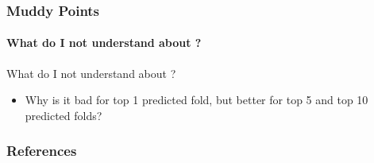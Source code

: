 \documentclass[xcolor={usenames,dvipsnames},hyperref={hyperindex,bookmarks}]{beamer}
\begin{document}









\frame
{
	\frametitle{Muddy Points}
	\framesubtitle{What do I not understand about \cite{Hou2018}?}

	What do I not understand about \cite{Hou2018}?
	\begin{itemize}
	\item Why is it bad for top 1 predicted fold, but better for top 5 and top 10 predicted folds?
	\end{itemize}

}















\frame
{
	\frametitle{References}



	{\linespread{1}
	
	
	}
}
\end{document}
